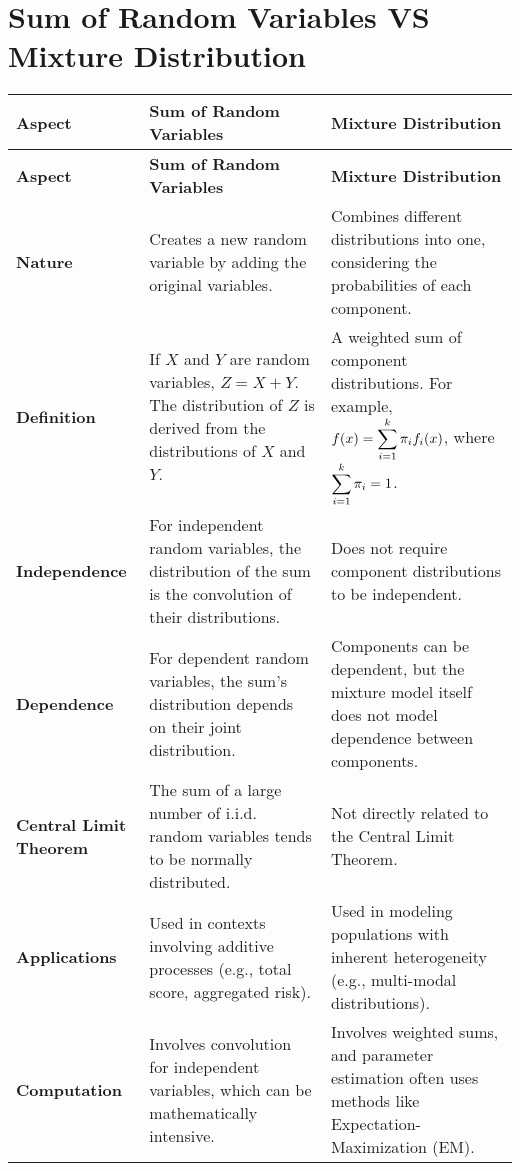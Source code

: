 \section{Sum of Random Variables VS Mixture Distribution \cite{chatgpt}}\label{Sum of Random Variables VS Mixture Distribution}

\begin{longtable}{|p{2.5cm}|p{5cm}|p{5cm}|}
    \hline
    \textbf{Aspect} & \textbf{Sum of Random Variables} & \textbf{Mixture Distribution} \\
    \hline
    \endfirsthead
    
    \hline
    \textbf{Aspect} & \textbf{Sum of Random Variables} & \textbf{Mixture Distribution} \\
    \hline
    \endhead
    
    \hline
    \endfoot
    
    \hline
    \endlastfoot
    
    \textbf{Nature} & 
    Creates a new random variable by adding the original variables. & 
    Combines different distributions into one, considering the probabilities of each component. \\
    \hline
    
    \textbf{Definition} & 
    If \( X \) and \( Y \) are random variables, \( Z = X + Y \). The distribution of \( Z \) is derived from the distributions of \( X \) and \( Y \). & 
    A weighted sum of component distributions. For example, \( f(x) = \displaystyle\sum_{i=1}^{k} \pi_i f_i(x) \), where \( \displaystyle\sum_{i=1}^{k} \pi_i = 1 \). \\
    \hline
    
    \textbf{Independence} & 
    For independent random variables, the distribution of the sum is the convolution of their distributions. & 
    Does not require component distributions to be independent. \\
    \hline
    
    \textbf{Dependence} & 
    For dependent random variables, the sum's distribution depends on their joint distribution. & 
    Components can be dependent, but the mixture model itself does not model dependence between components. \\
    \hline
    
    \textbf{Central Limit Theorem} & 
    The sum of a large number of i.i.d. random variables tends to be normally distributed. & 
    Not directly related to the Central Limit Theorem. \\
    \hline
    
    \textbf{Applications} & 
    Used in contexts involving additive processes (e.g., total score, aggregated risk). & 
    Used in modeling populations with inherent heterogeneity (e.g., multi-modal distributions). \\
    \hline
    
    \textbf{Computation} & 
    Involves convolution for independent variables, which can be mathematically intensive. & 
    Involves weighted sums, and parameter estimation often uses methods like Expectation-Maximization (EM). \\
    \hline

\end{longtable}


